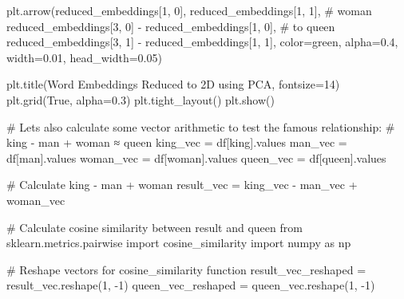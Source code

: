 \documentclass[
  letterpaper,
  DIV=11,
  numbers=noendperiod]{scrartcl}
\newenvironment{Shaded}{\begin{snugshade}}{\end{snugshade}}
\newcommand{\CommentTok}[1]{\textcolor[rgb]{0.37,0.37,0.37}{#1}}
\newcommand{\DecValTok}[1]{\textcolor[rgb]{0.68,0.00,0.00}{#1}}
\newcommand{\FloatTok}[1]{\textcolor[rgb]{0.68,0.00,0.00}{#1}}
\newcommand{\ImportTok}[1]{\textcolor[rgb]{0.00,0.46,0.62}{#1}}
\newcommand{\NormalTok}[1]{\textcolor[rgb]{0.00,0.23,0.31}{#1}}
\newcommand{\OperatorTok}[1]{\textcolor[rgb]{0.37,0.37,0.37}{#1}}
\newcommand{\StringTok}[1]{\textcolor[rgb]{0.13,0.47,0.30}{#1}}
\newcommand{\VariableTok}[1]{\textcolor[rgb]{0.07,0.07,0.07}{#1}}
\begin{document}
\begin{Shaded}
\begin{Highlighting}[]
\NormalTok{plt.arrow(reduced\_embeddings[}\DecValTok{1}\NormalTok{, }\DecValTok{0}\NormalTok{], reduced\_embeddings[}\DecValTok{1}\NormalTok{, }\DecValTok{1}\NormalTok{],  }\CommentTok{\# woman}
\NormalTok{          reduced\_embeddings[}\DecValTok{3}\NormalTok{, }\DecValTok{0}\NormalTok{] }\OperatorTok{{-}}\NormalTok{ reduced\_embeddings[}\DecValTok{1}\NormalTok{, }\DecValTok{0}\NormalTok{],  }\CommentTok{\# to queen}
\NormalTok{          reduced\_embeddings[}\DecValTok{3}\NormalTok{, }\DecValTok{1}\NormalTok{] }\OperatorTok{{-}}\NormalTok{ reduced\_embeddings[}\DecValTok{1}\NormalTok{, }\DecValTok{1}\NormalTok{],}
\NormalTok{          color}\OperatorTok{=}\StringTok{\textquotesingle{}green\textquotesingle{}}\NormalTok{, alpha}\OperatorTok{=}\FloatTok{0.4}\NormalTok{, width}\OperatorTok{=}\FloatTok{0.01}\NormalTok{, head\_width}\OperatorTok{=}\FloatTok{0.05}\NormalTok{)}

\NormalTok{plt.title(}\StringTok{\textquotesingle{}Word Embeddings Reduced to 2D using PCA\textquotesingle{}}\NormalTok{, fontsize}\OperatorTok{=}\DecValTok{14}\NormalTok{)}
\NormalTok{plt.grid(}\VariableTok{True}\NormalTok{, alpha}\OperatorTok{=}\FloatTok{0.3}\NormalTok{)}
\NormalTok{plt.tight\_layout()}
\NormalTok{plt.show()}

\CommentTok{\# Let\textquotesingle{}s also calculate some vector arithmetic to test the famous relationship:}
\CommentTok{\# king {-} man + woman ≈ queen}
\NormalTok{king\_vec }\OperatorTok{=}\NormalTok{ df[}\StringTok{\textquotesingle{}king\textquotesingle{}}\NormalTok{].values}
\NormalTok{man\_vec }\OperatorTok{=}\NormalTok{ df[}\StringTok{\textquotesingle{}man\textquotesingle{}}\NormalTok{].values}
\NormalTok{woman\_vec }\OperatorTok{=}\NormalTok{ df[}\StringTok{\textquotesingle{}woman\textquotesingle{}}\NormalTok{].values}
\NormalTok{queen\_vec }\OperatorTok{=}\NormalTok{ df[}\StringTok{\textquotesingle{}queen\textquotesingle{}}\NormalTok{].values}

\CommentTok{\# Calculate king {-} man + woman}
\NormalTok{result\_vec }\OperatorTok{=}\NormalTok{ king\_vec }\OperatorTok{{-}}\NormalTok{ man\_vec }\OperatorTok{+}\NormalTok{ woman\_vec}

\CommentTok{\# Calculate cosine similarity between result and queen}
\ImportTok{from}\NormalTok{ sklearn.metrics.pairwise }\ImportTok{import}\NormalTok{ cosine\_similarity}
\ImportTok{import}\NormalTok{ numpy }\ImportTok{as}\NormalTok{ np}

\CommentTok{\# Reshape vectors for cosine\_similarity function}
\NormalTok{result\_vec\_reshaped }\OperatorTok{=}\NormalTok{ result\_vec.reshape(}\DecValTok{1}\NormalTok{, }\OperatorTok{{-}}\DecValTok{1}\NormalTok{)}
\NormalTok{queen\_vec\_reshaped }\OperatorTok{=}\NormalTok{ queen\_vec.reshape(}\DecValTok{1}\NormalTok{, }\OperatorTok{{-}}\DecValTok{1}\NormalTok{)}


\end{Highlighting}
\end{Shaded}
\end{document}
